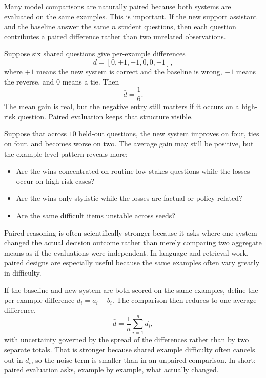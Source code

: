 Many model comparisons are naturally paired because both systems are evaluated on the same examples. This is important. If the new support assistant and the baseline answer the same $n$ student questions, then each question contributes a paired difference rather than two unrelated observations.

\begin{mathlens}
Suppose six shared questions give per-example differences
\[
d=[0,+1,-1,0,0,+1],
\]
where \(+1\) means the new system is correct and the baseline is wrong, \(-1\) means the reverse, and \(0\) means a tie. Then
\[
\bar{d}=\frac{1}{6}.
\]
The mean gain is real, but the negative entry still matters if it occurs on a high-risk question. Paired evaluation keeps that structure visible.
\end{mathlens}

Suppose that across $10$ held-out questions, the new system improves on four, ties on four, and becomes worse on two. The average gain may still be positive, but the example-level pattern reveals more:
\begin{itemize}[leftmargin=*]
\item Are the wins concentrated on routine low-stakes questions while the losses occur on high-risk cases?
\item Are the wins only stylistic while the losses are factual or policy-related?
\item Are the same difficult items unstable across seeds?
\end{itemize}

Paired reasoning is often scientifically stronger because it asks where one system changed the actual decision outcome rather than merely comparing two aggregate means as if the evaluations were independent. In language and retrieval work, paired designs are especially useful because the same examples often vary greatly in difficulty.

\begin{mathlens}
If the baseline and new system are both scored on the same examples, define the per-example difference \(d_i=a_i-b_i\). The comparison then reduces to one average difference,
\[
\bar{d}=\frac{1}{n}\sum_{i=1}^n d_i,
\]
with uncertainty governed by the spread of the differences rather than by two separate totals. That is stronger because shared example difficulty often cancels out in \(d_i\), so the noise term is smaller than in an unpaired comparison. In short: paired evaluation asks, example by example, what actually changed.
\end{mathlens}

